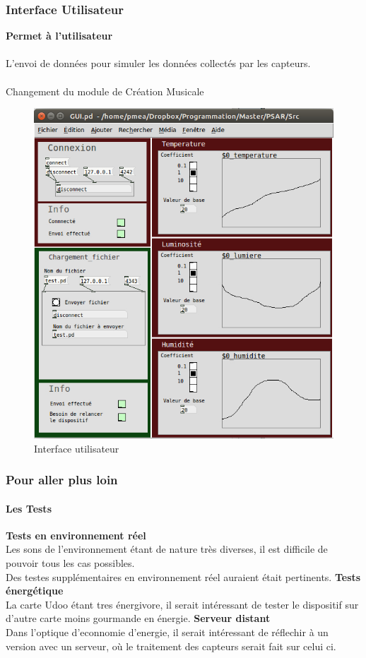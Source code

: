 \documentclass{beamer}
\begin{document}
\begin{frame}
\frametitle{Interface Utilisateur}
\begin{minipage}{0.49\textwidth}
\textbf{Permet à l'utilisateur}\\\\
L'envoi de données pour simuler les données collectés par les capteurs.\\\\
Changement du module de Création Musicale
\end{minipage}
\begin{minipage}{0.49\textwidth}
\begin{figure}
  \centering
  \includegraphics[width=\textwidth]{GUI.jpg} 
	\caption{Interface utilisateur}
\end{figure}
\end{minipage}
\end{frame}


\begin{frame}
\frametitle{Pour aller plus loin}
\framesubtitle{Les Tests}
\textbf{Tests en environnement réel}\\
Les sons de l'environnement étant de nature très diverses, il est difficile de pouvoir tous les cas possibles.\\
Des testes supplémentaires en environnement réel auraient était pertinents.
\newline
\newline
\textbf{Tests énergétique}\\
La carte Udoo étant tres énergivore, il serait intéressant de tester le dispositif sur d'autre carte moins gourmande en énergie.
\newline
\newline
\textbf{Serveur distant}\\
Dans l'optique d'econnomie d'energie, il serait intéressant de réflechir à un version avec un serveur, où le traitement des capteurs serait fait sur celui ci.
\end{frame}
\end{document}
